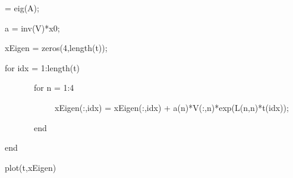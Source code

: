 \begin{enumerate}
   \begin{framed}
     [V,L] = eig(A);

     a = inv(V)*x0;

     xEigen = zeros(4,length(t));

     for idx = 1:length(t)

     ~~~~~~~for n = 1:4

     ~~~~~~~~~~~~xEigen(:,idx) = xEigen(:,idx) + a(n)*V(:,n)*exp(L(n,n)*t(idx));

     ~~~~~~~end

     end

     plot(t,xEigen)
   \end{framed}

\end{enumerate}
